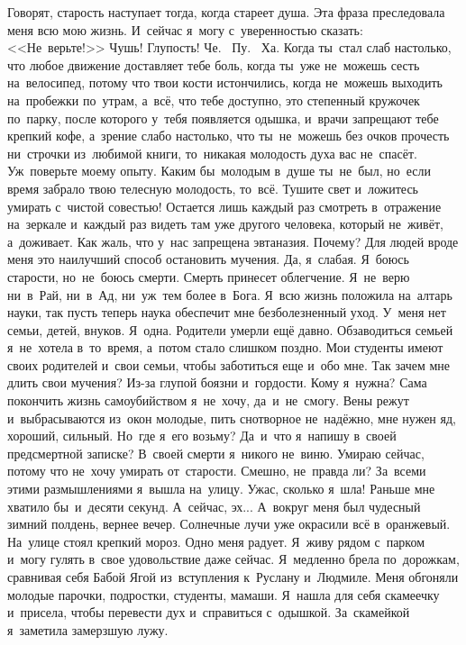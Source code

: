 \clearpage
\chaps{***} 
\lettrine[lines=3, loversize=0.1]{Г}{}оворят, старость наступает тогда, когда стареет душа.
Эта фраза преследовала меня всю мою жизнь.
И~сейчас я~могу с~уверенностью сказать: <<Не~верьте!>>
Чушь!
Глупость!
Че.~
Пу.~
Ха.
Когда ты~стал слаб настолько, что любое движение доставляет тебе боль, когда ты~уже не~можешь сесть на~велосипед, потому что твои кости истончились, когда не~можешь выходить на~пробежки по~утрам, а~всё, что тебе доступно, это степенный кружочек по~парку, после которого у~тебя появляется одышка, и~врачи запрещают тебе крепкий кофе, а~зрение слабо настолько, что ты~не~можешь без очков прочесть ни~строчки из~любимой книги, то~никакая молодость духа вас не~спасёт.
Уж~поверьте моему опыту.
Каким бы~молодым в~душе ты~не~был, но~если время забрало твою телесную молодость, то~всё.
Тушите свет и~ложитесь умирать с~чистой совестью! Остается лишь каждый раз смотреть в~отражение на~зеркале и~каждый раз видеть там уже другого человека, который не~живёт, а~доживает.
Как жаль, что у~нас запрещена эвтаназия.
Почему? Для людей вроде меня это наилучший способ остановить мучения.
Да, я~слабая.
Я~боюсь старости, но~не~боюсь смерти.
Смерть принесет облегчение.
Я~не~верю ни~в~Рай, ни~в~Ад, ни~уж~тем более в~Бога.
Я~всю жизнь положила на~алтарь науки, так пусть теперь наука обеспечит мне безболезненный уход.
У~меня нет семьи, детей, внуков.
Я~одна.
Родители умерли ещё давно.
Обзаводиться семьей я~не~хотела в~то~время, а~потом стало слишком поздно.
Мои студенты имеют своих родителей и~свои семьи, чтобы заботиться еще и~обо мне.
Так зачем мне длить свои мучения? Из-за глупой боязни и~гордости.
Кому я~нужна? Сама покончить жизнь самоубийством я~не~хочу, да~и~не~смогу.
Вены режут и~выбрасываются из~окон молодые, пить снотворное не~надёжно, мне нужен яд, хороший, сильный.
Но~где я~его возьму?
Да~и~что я~напишу в~своей предсмертной записке?
В~своей смерти я~никого не~виню.
Умираю сейчас, потому что не~хочу умирать от~старости.
Смешно, не~правда ли? За~всеми этими размышлениями я~вышла на~улицу.
Ужас, сколько я~шла! Раньше мне хватило бы~и~десяти секунд.
А~сейчас, эх... А~вокруг меня был чудесный зимний полдень, вернее вечер.
Солнечные лучи уже окрасили всё в~оранжевый.
На~улице стоял крепкий мороз.
Одно меня радует.
Я~живу рядом с~парком и~могу гулять в~свое удовольствие даже сейчас.
Я~медленно брела по~дорожкам, сравнивая себя Бабой Ягой из~вступления к~Руслану и~Людмиле.
Меня обгоняли молодые парочки, подростки, студенты, мамаши.
Я~нашла для себя скамеечку и~присела, чтобы перевести дух и~справиться с~одышкой.
За~скамейкой я~заметила замерзшую лужу.
